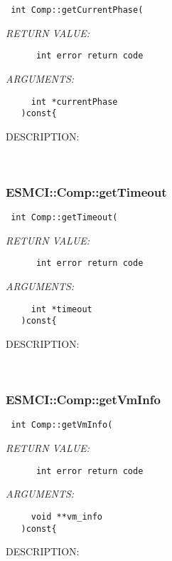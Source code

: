   
\begin{verbatim} int Comp::getCurrentPhase(\end{verbatim}{\em RETURN VALUE:}
\begin{verbatim}      int error return code\end{verbatim}{\em ARGUMENTS:}
\begin{verbatim}     int *currentPhase
   )const{\end{verbatim}
{\sf DESCRIPTION:\\ }


   
 
\mbox{}\hrulefill\
 
\subsubsection [ESMCI::Comp::getTimeout] {ESMCI::Comp::getTimeout}


  
\begin{verbatim} int Comp::getTimeout(\end{verbatim}{\em RETURN VALUE:}
\begin{verbatim}      int error return code\end{verbatim}{\em ARGUMENTS:}
\begin{verbatim}     int *timeout
   )const{\end{verbatim}
{\sf DESCRIPTION:\\ }


   
 
\mbox{}\hrulefill\
 
\subsubsection [ESMCI::Comp::getVmInfo] {ESMCI::Comp::getVmInfo}


  
\begin{verbatim} int Comp::getVmInfo(\end{verbatim}{\em RETURN VALUE:}
\begin{verbatim}      int error return code\end{verbatim}{\em ARGUMENTS:}
\begin{verbatim}     void **vm_info
   )const{\end{verbatim}
{\sf DESCRIPTION:\\ }


